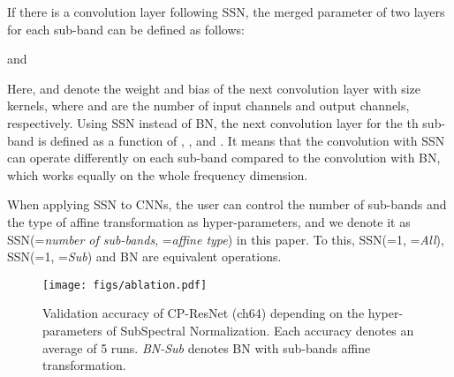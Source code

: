 \documentclass{article}
\begin{document}
If there is a convolution layer following SSN, the merged parameter of two layers for each sub-band can be defined as follows:

and

Here,  and  denote the weight and bias of the next convolution layer with  size kernels, where  and  are the number of input channels and output channels, respectively.
Using SSN instead of BN, the next convolution layer for the th sub-band is defined as a function of , ,  and . It means that the convolution with SSN can operate differently on each sub-band compared to the convolution with BN, which works equally on the whole frequency dimension.

When applying SSN to CNNs, the user can control the number of sub-bands and the type of affine transformation as hyper-parameters, and we denote it as SSN(=\textit{number of sub-bands}, =\textit{affine type}) in this paper. To this, SSN(=1, =\textit{All}), SSN(=1, =\textit{Sub}) and BN are equivalent operations.





\begin{table}[t]
\caption{Results on TAU Urban Acoustic Scenes 2019.
}
\vskip 0.1in
\label{tab:dcase2019}
\end{table}

\begin{figure}[t]
\centering
\texttt{[image: figs/ablation.pdf]}
\vskip -0.1in
\caption{Validation accuracy of CP-ResNet (ch64) depending on the hyper-parameters of SubSpectral Normalization. Each accuracy denotes an average of 5 runs. \textit{BN-Sub} denotes BN with sub-bands affine transformation.}
\label{fig:ablation}
\end{figure}
\end{document}

